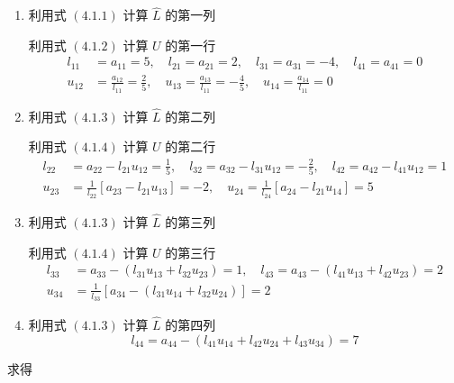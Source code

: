 \begin{solution}
\begin{enumerate}
                    \item 利用式 $(4.1.1)$ 计算 $\hat{L}$ 的第一列
                        \par 利用式 $(4.1.2)$ 计算 $U$ 的第一行
                        \begin{align*}
                            l_{11} &= a_{11} = 5, \quad l_{21} = a_{21} = 2, \quad l_{31} = a_{31} = -4, \quad l_{41} = a_{41} = 0 \\
                            u_{12} &= \frac{a_{12}}{l_{11}} = \frac{2}{5}, \quad u_{13} = \frac{a_{13}}{l_{11}} = -\frac{4}{5}, \quad u_{14} = \frac{a_{14}}{l_{11}} = 0
                        \end{align*}
                    \item 利用式 $(4.1.3)$ 计算 $\hat{L}$ 的第二列
                        \par 利用式 $(4.1.4)$ 计算 $U$ 的第二行
                        \begin{align*}
                            l_{22} &= a_{22} - l_{21}u_{12} = \frac{1}{5}, \quad  l_{32} = a_{32} - l_{31}u_{12} = -\frac{2}{5}, \quad  l_{42} = a_{42} - l_{41}u_{12} = 1 \\
                            u_{23} &= \frac{1}{l_{22}}[a_{23} - l_{21}u_{13}] = -2, \quad u_{24} = \frac{1}{l_{24}}[a_{24} - l_{21}u_{14}] = 5        
                        \end{align*} 
                    \item 利用式 $(4.1.3)$ 计算 $\hat{L}$ 的第三列
                        \par 利用式 $(4.1.4)$ 计算 $U$ 的第三行
                        \begin{align*}
                            l_{33} &= a_{33} - (l_{31}u_{13} + l_{32}u_{23}) = 1, \quad  l_{43} = a_{43} - (l_{41}u_{13} + l_{42}u_{23}) = 2 \\
                            u_{34} &= \frac{1}{l_{33}}[a_{34} - (l_{31}u_{14} + l_{32}u_{24})] = 2
                        \end{align*}
                    \item 利用式 $(4.1.3)$ 计算 $\hat{L}$ 的第四列
                        \begin{equation*}
                            l_{44} = a_{44} - (l_{41}u_{14} + l_{42}u_{24} + l_{43}u_{34}) = 7
                        \end{equation*}
                \end{enumerate} 
                    \par 求得

\end{solution}
